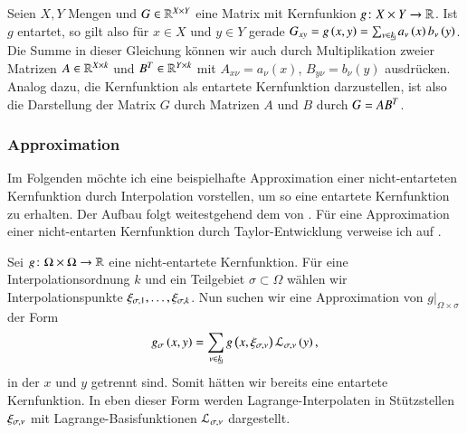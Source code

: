Seien $X, Y$ Mengen und $G \in \mathbb{R}^{X \times Y}$ eine Matrix mit Kernfunkion $g \colon X \times Y \to \mathbb{R}$. Ist $g$ entartet, so gilt also für $x \in X$ und $y \in Y$ 
gerade $G_{xy} = g\left(x, y\right) = \sum_{\nu \in \haken{k}} a_{\nu}\left(x\right) b_{\nu}\left(y\right)$. Die Summe in dieser Gleichung können wir auch durch Multiplikation zweier Matrizen $A \in \mathbb{R}^{X \times k}$ und 
$B^T \in \mathbb{R}^{Y \times k}$ mit $A_{x\nu} = a_{\nu}\left(x\right)$, $B_{y\nu} = b_{\nu}\left(y\right)$ ausdrücken. Analog dazu, die Kernfunktion als entartete Kernfunktion darzustellen, ist also die Darstellung der Matrix
$G$ durch Matrizen $A$ und $B$ durch $G = AB^T$.
    
    \subsubsection{Approximation}
    \label{sec:approx}
      Im Folgenden möchte ich eine beispielhafte Approximation einer nicht-entarteten Kernfunktion durch Interpolation vorstellen, um so eine entartete Kernfunktion zu erhalten.
      Der Aufbau folgt weitestgehend dem von \citet{nichtlokop}. Für eine Approximation einer nicht-entarten Kernfunktion durch Taylor-Entwicklung verweise ich auf \citet{h2diss}. 
      
      Sei $g \colon \Omega \times \Omega \to \mathbb{R}$ eine nicht-entartete Kernfunktion. Für eine Interpolationsordnung $k$ und ein Teilgebiet $\sigma \subset \Omega$ wählen wir Interpolationspunkte 
      $\xi_{\sigma, 1}, \dots , \xi_{\sigma, k}$. Nun suchen wir eine Approximation von $\left. g\right|_{\Omega \times \sigma}$ der Form
      \begin{equation}
      \label{eq:gsigma}
	g_\sigma\left(x, y\right) = \sum_{\nu \in \haken{k}} g\left(x, \xi_\inds{\nu}\right) \lag_\inds{\nu}\left(y\right),
      \end{equation}
      in der $x$ und $y$ getrennt sind. Somit hätten wir bereits eine entartete Kernfunktion. In eben dieser Form werden Lagrange-Interpolaten in Stützstellen 
      $\xi_{\sigma, \nu}$ mit Lagrange-Basisfunktionen $\mathcal{L}_{\sigma, \nu}$ dargestellt. 
      
